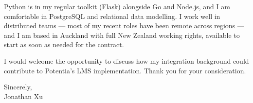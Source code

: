 \documentclass[11pt,a4paper]{article}
\begin{document}
Python is in my regular toolkit (Flask) alongside Go and Node.js, and I am comfortable in PostgreSQL and relational data modelling. I work well in distributed teams — most of my recent roles have been remote across regions — and I am based in Auckland with full New Zealand working rights, available to start as soon as needed for the contract.

I would welcome the opportunity to discuss how my integration background could contribute to Potentia's LMS implementation. Thank you for your consideration.

\vspace{0.5em}

Sincerely, \\
Jonathan Xu
\end{document}
